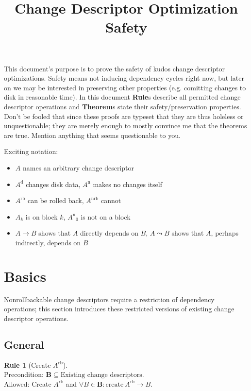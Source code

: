 \documentclass{article}
\title{Change Descriptor Optimization Safety}
\author{}
\date{}
\theoremstyle{definition}
\newtheorem{chrule}{Rule}[section]
\newcommand{\cd}[1]{\ensuremath{#1}}
\newcommand{\cdb}[2]{\ensuremath{\cd{#1}_#2}}
\newcommand{\dcd}[1]{\ensuremath{\cd{#1}^\mathrm{d}}}
\newcommand{\ncd}[1]{\ensuremath{\cd{#1}^\mathrm{n}}}
\newcommand{\rb}[1]{\ensuremath{\cd{#1}^\mathrm{rb}}}
\newcommand{\nrb}[1]{\ensuremath{\cd{#1}^\mathrm{nrb}}}
\newcommand{\depends}[2]{\ensuremath{#1\! \rightarrow\! #2}}
\newcommand{\indirdepends}[2]{\ensuremath{#1\! \leadsto\! #2}}
\newcommand{\cdset}[1]{\ensuremath{\mathbf{#1}}}
\begin{document}
\maketitle

This document's purpose is to prove the safety of kudos change
descriptor optimizations. Safety means not inducing dependency cycles
right now, but later on we may be interested in preserving other
properties (e.g. comitting changes to disk in reasonable time).
%
In this document \textbf{Rule}s describe all permitted change
descriptor operations and \textbf{Theorem}s state their
safety/preservation properties.
%
Don't be fooled that since these proofs are typeset that they are thus
holeless or unquestionable; they are merely enough to mostly convince
me that the theorems are true. Mention anything that seems
questionable to you.

Exciting notation:
\begin{itemize}
\item \cd{A} names an arbitrary change descriptor
\item \dcd{A} changes disk data, \ncd{A} makes no changes itself
\item \rb{A} can be rolled back, \nrb{A} cannot
\item \cdb{A}{k} is on block $k$, \cdb{\ncd{A}}{0} is not on a block
\item \depends{\cd{A}}{\cd{B}} shows that \cd{A} directly depends on
  \cd{B}, \indirdepends{\cd{A}}{\cd{B}} shows that \cd{A}, perhaps
  indirectly, depends on \cd{B}
\end{itemize}
\section{Basics}
\label{sec:basics}

Nonrollbackable change descriptors require a restriction of dependency
operations; this section introduces these restricted versions of
existing change descriptor operations.

\subsection{General}
\label{sec:basics:general}

\begin{chrule}[Create \rb{A}]\label{chrule:create}
  \mbox{}\\
  Precondition: \(\cdset{B} \subseteq \mbox{Existing change descriptors}\).\\
  Allowed: Create \rb{A} and \(\forall \cd{B}\! \in\! \cdset{B}\!: \mbox{create}\ \depends{\rb{A}}{\cd{B}}\).
\end{chrule}
\end{document}
